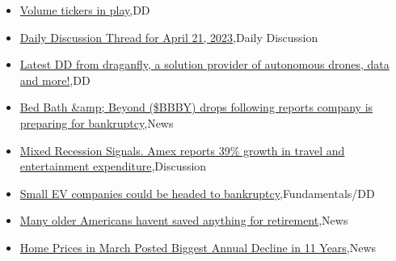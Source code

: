 \documentclass{article}%
\begin{document}
%
\begin{itemize}%
\item%
\href{https://reddit.com/r/wallstreetbets/comments/12tzpq0/volume\_tickers\_in\_play/}{Volume tickers in play},DD%
\item%
\href{https://reddit.com/r/wallstreetbets/comments/12twp9i/daily\_discussion\_thread\_for\_april\_21\_2023/}{Daily Discussion Thread for April 21, 2023},Daily Discussion%
\item%
\href{https://reddit.com/r/Baystreetbets/comments/12t71yy/latest\_dd\_from\_draganfly\_a\_solution\_provider\_of/}{Latest DD from draganfly, a solution provider of autonomous drones, data and more!},DD%
\item%
\href{https://reddit.com/r/StockMarket/comments/12tr886/bed\_bath\_beyond\_bbby\_drops\_following\_reports/}{Bed Bath \&amp; Beyond (\$BBBY) drops following reports company is preparing for bankruptcy},News%
\item%
\href{https://reddit.com/r/StockMarket/comments/12tl8do/mixed\_recession\_signals\_amex\_reports\_39\_growth\_in/}{Mixed Recession Signals. Amex reports 39\% growth in travel and entertainment expenditure},Discussion%
\item%
\href{https://reddit.com/r/StockMarket/comments/12thix2/small\_ev\_companies\_could\_be\_headed\_to\_bankruptcy/}{Small EV companies could be headed to bankruptcy},Fundamentals/DD%
\item%
\href{https://reddit.com/r/Economics/comments/12ts109/many\_older\_americans\_havent\_saved\_anything\_for/}{Many older Americans havent saved anything for retirement},News%
\item%
\href{https://reddit.com/r/Economics/comments/12tjqz3/home\_prices\_in\_march\_posted\_biggest\_annual/}{Home Prices in March Posted Biggest Annual Decline in 11 Years},News%
\end{itemize}%
\end{document}
